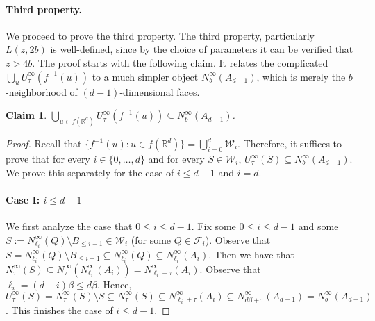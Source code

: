 \documentclass[11pt,letterpaper]{article}
\theoremstyle{plain}
\newtheorem{claim}[theorem]{Claim}
\theoremstyle{definition}
\theoremstyle{remark}
\begin{document}
\paragraph{Third property.}
We proceed to prove the third property.
The third property, particularly $L(z, 2b)$ is well-defined, since by the choice of parameters it can be verified that $z > 4b$.
The proof starts with the following claim. It relates the complicated $\bigcup_{u} U_\tau^\infty(f^{-1}(u))$
to a much simpler object $N_b^\infty(A_{d - 1})$, which is merely the $b$-neighborhood of $(d - 1)$-dimensional faces.
\begin{claim}
    \label{claim:A_N} 
    $\bigcup_{u\in f(\mathbb{R}^{d})}U_{\tau}^{\infty}(f^{-1}(u))\subseteq N_{b}^{\infty}(A_{d-1})$. 
\end{claim}
\begin{proof}
Recall that $\{f^{-1}(u): u\in f(\mathbb{R}^{d})\} = \bigcup_{i=0}^{d}\mathcal{W}_{i}$.
Therefore, it suffices to prove that for every $i\in\{0, \ldots, d\}$ and for every $S\in \mathcal{W}_{i}$, $U_{\tau}^{\infty}(S)\subseteq N_{b}^{\infty}(A_{d-1})$. 
We prove this separately for the case of $i\leq d-1$ and $i=d$. 

\paragraph{Case I: $i \leq d - 1$}
We first analyze the case that $0 \leq i \leq d - 1$. 
Fix some $0 \leq i \leq d-1$
and some $S := N_{\ell_i}^\infty(Q) \setminus B_{\leq i - 1} \in\mathcal{W}_{i}$ (for some $Q \in \mathcal{F}_i$).
Observe that $S = N_{\ell_i}^{\infty}(Q)\setminus B_{\leq i-1} \subseteq N_{\ell_{i}}^{\infty}(Q)\subseteq N_{\ell_{i}}^{\infty}(A_{i})$. 
Then we have that $N_{\tau}^{\infty}(S)\subseteq N_{\tau}^{\infty}(N_{\ell_{i}}^{\infty}(A_{i})) = N_{\ell_{i}+\tau}^{\infty}(A_{i})$. 
Observe that $\ell_{i} = (d-i)\beta \leq d\beta$.
Hence, $U_\tau^\infty(S) = N_\tau^\infty(S) \setminus S \subseteq 
N_\tau^\infty(S) \subseteq N_{\ell_i + \tau}^\infty(A_i) \subseteq N_{d\beta + \tau}^\infty(A_{d - 1}) = N_b^\infty(A_{d - 1})$.
This finishes the case of $i \leq d - 1$.


\end{proof}
\end{document}
